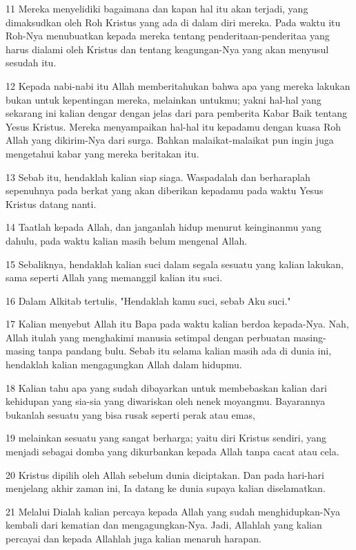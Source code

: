 \par 11 Mereka menyelidiki bagaimana dan kapan hal itu akan terjadi, yang dimaksudkan oleh Roh Kristus yang ada di dalam diri mereka. Pada waktu itu Roh-Nya menubuatkan kepada mereka tentang penderitaan-penderitaa yang harus dialami oleh Kristus dan tentang keagungan-Nya yang akan menyusul sesudah itu.
\par 12 Kepada nabi-nabi itu Allah memberitahukan bahwa apa yang mereka lakukan bukan untuk kepentingan mereka, melainkan untukmu; yakni hal-hal yang sekarang ini kalian dengar dengan jelas dari para pemberita Kabar Baik tentang Yesus Kristus. Mereka menyampaikan hal-hal itu kepadamu dengan kuasa Roh Allah yang dikirim-Nya dari surga. Bahkan malaikat-malaikat pun ingin juga mengetahui kabar yang mereka beritakan itu.
\par 13 Sebab itu, hendaklah kalian siap siaga. Waspadalah dan berharaplah sepenuhnya pada berkat yang akan diberikan kepadamu pada waktu Yesus Kristus datang nanti.
\par 14 Taatlah kepada Allah, dan janganlah hidup menurut keinginanmu yang dahulu, pada waktu kalian masih belum mengenal Allah.
\par 15 Sebaliknya, hendaklah kalian suci dalam segala sesuatu yang kalian lakukan, sama seperti Allah yang memanggil kalian itu suci.
\par 16 Dalam Alkitab tertulis, "Hendaklah kamu suci, sebab Aku suci."
\par 17 Kalian menyebut Allah itu Bapa pada waktu kalian berdoa kepada-Nya. Nah, Allah itulah yang menghakimi manusia setimpal dengan perbuatan masing-masing tanpa pandang bulu. Sebab itu selama kalian masih ada di dunia ini, hendaklah kalian mengagungkan Allah dalam hidupmu.
\par 18 Kalian tahu apa yang sudah dibayarkan untuk membebaskan kalian dari kehidupan yang sia-sia yang diwariskan oleh nenek moyangmu. Bayarannya bukanlah sesuatu yang bisa rusak seperti perak atau emas,
\par 19 melainkan sesuatu yang sangat berharga; yaitu diri Kristus sendiri, yang menjadi sebagai domba yang dikurbankan kepada Allah tanpa cacat atau cela.
\par 20 Kristus dipilih oleh Allah sebelum dunia diciptakan. Dan pada hari-hari menjelang akhir zaman ini, Ia datang ke dunia supaya kalian diselamatkan.
\par 21 Melalui Dialah kalian percaya kepada Allah yang sudah menghidupkan-Nya kembali dari kematian dan mengagungkan-Nya. Jadi, Allahlah yang kalian percayai dan kepada Allahlah juga kalian menaruh harapan.
